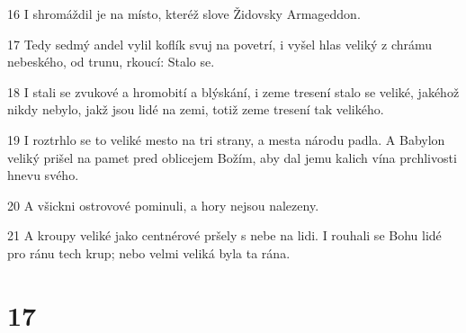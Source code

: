 \par 16 I shromáždil je na místo, kteréž slove Židovsky Armageddon.
\par 17 Tedy sedmý andel vylil koflík svuj na povetrí, i vyšel hlas veliký z chrámu nebeského, od trunu, rkoucí: Stalo se.
\par 18 I stali se zvukové a hromobití a blýskání, i zeme tresení stalo se veliké, jakéhož nikdy nebylo, jakž jsou lidé na zemi, totiž zeme tresení tak velikého.
\par 19 I roztrhlo se to veliké mesto na tri strany, a mesta národu padla. A Babylon veliký prišel na pamet pred oblicejem Božím, aby dal jemu kalich vína prchlivosti hnevu svého.
\par 20 A všickni ostrovové pominuli, a hory nejsou nalezeny.
\par 21 A kroupy veliké jako centnérové pršely s nebe na lidi. I rouhali se Bohu lidé pro ránu tech krup; nebo velmi veliká byla ta rána.

\chapter{17}

